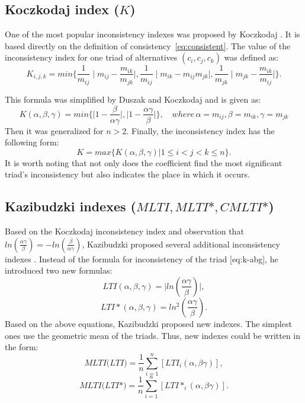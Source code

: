 \subsection{Koczkodaj index ($\textit{K}$)}

One of the most popular inconsistency indexes was proposed by Koczkodaj \cite{KOCZKODAJ1993}. It is based directly on the definition of consistency~\ref{eq:consistent}. The value of the inconsistency index for one triad of alternatives $(c_i, c_j, c_k)$ was defined as:
	\begin{equation} 
		\label{eq:K}
		K_{i,j,k}=min\{\frac{1}{m_{ij}}\mid m_{ij}-\frac{m_{ik}}{m_{jk}}\mid,\frac{1}{m_{ij}}\mid m_{ik}-m_{ij}m_{jk}\mid,\frac{1}{m_{jk}}\mid m_{jk}-\frac{m_{ik}}{m_{ij}}\mid\}.
	 \end{equation}

 This formula was simplified by Duszak and Koczkodaj \cite{DUSZAK1994} and is given as:
 	\begin{equation} 
		K(\alpha,\beta,\gamma)=min\{\mid1-\frac{\beta}{\alpha\gamma}\mid,\mid1-\frac{\alpha\gamma}{\beta}\mid\},\,\,\,\,\,\,where\,\alpha=m_{ij},\beta=m_{ik},\gamma=m_{jk}
	 \end{equation}
 Then it was generalized \cite{DUSZAK1994} for $n>2$. Finally, the inconsistency index has the following form:
 	\begin{equation} 
		K=max\{K(\alpha,\beta,\gamma)|1\leq i<j<k\leq n\}.
	 \end{equation}
 It is worth noting that not only does the coefficient find the most significant triad's inconsistency but also indicates the place in which it occurs.


\subsection{Kazibudzki indexes ($\textit{MLTI}, \textit{MLTI*}, \textit{CMLTI*}$)}

Based on the Koczkodaj inconsistency index and observation that $ln(\frac{\alpha\gamma}{\beta})=-ln(\frac{\beta}{\alpha\gamma})$, Kazibudzki proposed several additional inconsistency indexes \cite{Kazibudzki2016}. Instead of the formula for inconsistency of the triad [eq:k-abg], he introduced two new formulas:
	\begin{equation} 
		LTI(\alpha,\beta,\gamma)=\mid ln(\frac{\alpha\gamma}{\beta})\mid,
	 \end{equation}
	\begin{equation}
		\label{eq:lti*} 
		LTI*(\alpha,\beta,\gamma)=ln^{2}(\frac{\alpha\gamma}{\beta}).
	 \end{equation}
Based on the above equations, Kazibudzki proposed new indexes. The simplest ones use the geometric mean of the triads. Thus, new indexes could be written in the form:
	\begin{equation} 
	\textit{MLTI(LTI)}=\frac{1}{n}\sum_{i=1}^{n}\left[LTI_{i}(\alpha,\beta\gamma)\right],
	 \end{equation}
 	\begin{equation} 
		\textit{MLTI(LTI*)}=\frac{1}{n}\sum_{i=1}^{n}\left[LTI*_{i}(\alpha,\beta\gamma)\right].
			 \end{equation}
 

